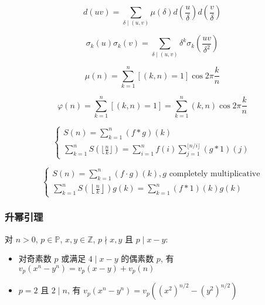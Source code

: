 \begin{equation}
    d(uv) = \sum_{\delta\mid (u, v)}\mu(\delta)d\left(\frac{u}{\delta}\right)d\left(\frac{v}{\delta}\right)
\end{equation}

\begin{equation}
    \sigma_k(u)\sigma_k(v) = \sum_{\delta\mid (u, v)}\delta^k\sigma_k(\frac{uv}{\delta^2})
\end{equation}

\begin{equation}
    \mu(n) = \sum_{k=1}^n[(k, n)=1]\cos{2\pi \frac{k}{n}}
\end{equation}

\begin{equation}
    \varphi(n) = \sum_{k=1}^n[(k, n)=1] = \sum_{k=1}^n(k, n)\cos{2\pi \frac{k}{n}}
\end{equation}

\begin{equation}
    \begin{cases}
        S(n) = \sum_{k=1}^n(f * g)(k) \\
        \sum_{k=1}^nS(\lfloor \frac n k \rfloor) = \sum_{i=1}^nf(i)\sum_{j=1}^{\lfloor n/i \rfloor}(g * 1)(j)
    \end{cases}
\end{equation}

\begin{equation}
    \begin{cases}
        S(n) = \sum_{k=1}^n(f \cdot g)(k), g \text{ completely multiplicative} \\
        \sum_{k=1}^nS\left(\left\lfloor \frac n k \right\rfloor\right)g(k) = \sum_{k=1}^n(f * 1)(k)g(k)
    \end{cases}
\end{equation}

\subsubsection{升幂引理}

对 \(n>0\), \(p\in\mathbb{P}\), \(x,y\in\mathbb{Z}\), \(p\nmid x,y\) 且 \(p\mid x-y\):

\begin{itemize}
    \item 对奇素数 \(p\) 或满足 \(4\mid x-y\) 的偶素数 \(p\), 有 \(v_p\left(x^n-y^n\right)=v_p(x-y)+v_p(n)\)
    \item \(p=2\) 且 \(2\mid n\), 有 \(v_p\left(x^n-y^n\right)=v_p\left(\left(x^2\right)^{n/2}-\left(y^2\right)^{n/2}\right)\)
\end{itemize}

